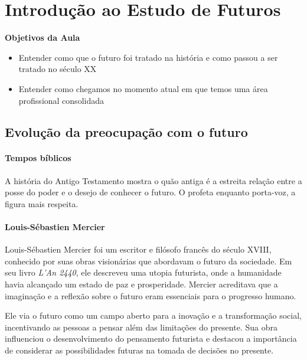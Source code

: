 \pagebreak
\section{Introdução ao Estudo de Futuros}

\begin{slidecontent}
\textbf{Objetivos da Aula}
\begin{itemize}
    \item Entender como que o futuro foi tratado na história e como passou a ser tratado no século XX
    \item Entender como chegamos no momento atual em que temos uma área profissional consolidada
\end{itemize}
\end{slidecontent}

\subsection*{Evolução da preocupação com o futuro}


\paragraph{Tempos bíblicos}
A história do Antigo Testamento mostra o quão antiga é a estreita relação entre a posse do poder e o desejo de conhecer o futuro.
O profeta enquanto porta-voz, a figura mais respeita.

\paragraph{Louis-Sébastien Mercier}

Louis-Sébastien Mercier foi um escritor e filósofo francês do século XVIII, conhecido por suas obras visionárias que abordavam o futuro da sociedade. Em seu livro \textit{L'An 2440}, ele descreveu uma utopia futurista, onde a humanidade havia alcançado um estado de paz e prosperidade. Mercier acreditava que a imaginação e a reflexão sobre o futuro eram essenciais para o progresso humano.

Ele via o futuro como um campo aberto para a inovação e a transformação social, incentivando as pessoas a pensar além das limitações do presente. Sua obra influenciou o desenvolvimento do pensamento futurista e destacou a importância de considerar as possibilidades futuras na tomada de decisões no presente.

